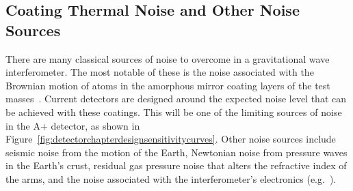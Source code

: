\subsection{Coating Thermal Noise and Other Noise Sources}
There are many classical sources of noise to overcome in a gravitational wave interferometer. The most notable of these is the noise associated with the Brownian motion of atoms in the amorphous mirror coating layers of the test masses~\cite{Flaminio2010}. Current detectors are designed around the expected noise level that can be achieved with these coatings. This will be one of the limiting sources of noise in the A+ detector, as shown in Figure~\ref{fig:detectorchapterdesignsensitivitycurves}. Other noise sources include seismic noise from the motion of the Earth, Newtonian noise from pressure waves in the Earth's crust, residual gas pressure noise that alters the refractive index of the arms, and the noise associated with the interferometer's electronics (e.g.~\cite{Weiss1972,Buikema2020}).
